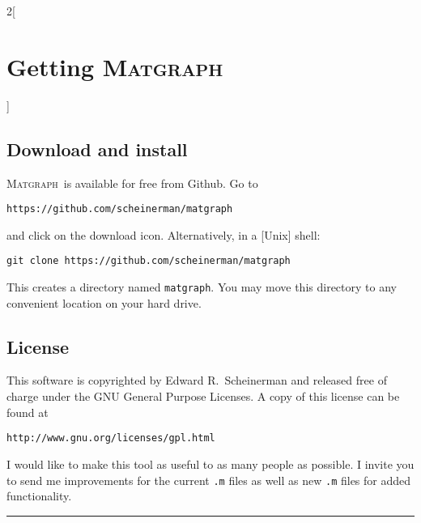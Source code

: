 \documentclass{amsart}
\newcommand\matgraph{\textsc{Matgraph}}
\begin{document}
\begin{multicols}{2}[\section{Getting \matgraph}]
\label{sect:getting}

\subsection{Download and install}

\matgraph\ is available for free from Github. Go to 
\begin{verbatim}
https://github.com/scheinerman/matgraph
\end{verbatim}
and click on the download icon. Alternatively, in a [Unix] shell:
\begin{verbatim}
git clone https://github.com/scheinerman/matgraph
\end{verbatim}
This creates a directory named \verb|matgraph|. You may move this
directory to any convenient location on your hard drive.




\subsection{License}

This software is copyrighted by Edward R.~Scheinerman and released
free of charge under the GNU General Purpose Licenses. A copy of this
license can be found at
\begin{verbatim}
http://www.gnu.org/licenses/gpl.html
\end{verbatim}

I would like to make this tool as useful to as many people as
possible. I invite you to send me improvements for the current
\verb|.m| files as well as new \verb|.m| files for added
functionality.



\end{multicols}
\hrule
\end{document}
